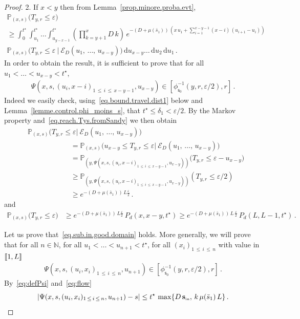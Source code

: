 \documentclass[AHL,Unicode,longabstracts,published]{cedram}
\newcommand{\llbracket}{\mathopen{[\mkern -2.7mu[}}
\newcommand{\rrbracket}{\mathclose{]\mkern -2.7mu]}}
\newcommand{\PP}{\mathbb{P}}
\newcommand{\NN}{\mathbb{N}}
\newcommand{\clE}{\mathcal{E}}
\newcommand{\Sin}{{\mathbf s}_{\textrm{\tiny\rm in}}}
\newcommand{\dif}{\mathrm{d}}
\newcommand{\barmu}{\mu(\bar s_1)}
\newcommand{\ens}[2]{\left[#1,#2\right]}
\newcommand{\phis}{\phi_{\textsf{s}_0}^{-1}}
\newcommand{\setunL}{\llbracket 1, L\rrbracket}
\newcommand{\1}{\mathbf{1}}
\begin{document}
\begin{proof}
2. If $x<y$ then from Lemma~\ref{prop.minore.proba.evt},
\begin{multline}\label{eq.proba.atteinte.depuis.S}
\PP_{(x,s)}
\Big(T_{y,r} \leq \varepsilon\Big)
\\
\geq \int_0^{t^\star} \int_{u_1}^{t^\star}\dots \int_{u_{y-x-1}}^{t^\star}
\left(\prod_{k=y+1}^{x}D\,k\right)\, e^{-(D+\barmu)\,\left(x\,u_1+
\sum\limits_{i=1}^{x-y-1}(x-i)\,(u_{i+1}-u_{i})\right)}\,
\\
\PP_{(x,s)}
\Big(T_{y,r} \leq \varepsilon \ \Big| \ \clE_D(u_1,\,\dots,\,u_{x-y}) \Big)\,
\dif u_{x-y}\dots\,\dif u_2\,\dif u_1\,.
\end{multline}
In order to obtain the result, it is sufficient to prove that for all $u_1<\dots <u_{x-y}<t^\star$,
\begin{align}\label{eq.sub.in.good.domain}
\Psi\left(x,s,(u_i,x-i)_{1\,\leq\,i\,\leq\,x-y-1},u_{x-y}\right)\in \ens{\phis(y,r, \varepsilon/2)}{r}\,.
\end{align}
Indeed we easily check, using~\eqref{eq.bound.travel.dist1} below and Lemma~\ref{lemme.control.phi_moins_s}, that $t^\star\leq \delta_1<\varepsilon/2$. By the Markov property and~\eqref{eq.reach.Tys.fromSandy} we then obtain
\begin{align*}
&\PP_{(x,s)}
\Big(T_{y,r} \leq \varepsilon \Big| \ \clE_D(u_1,\,\dots,\,u_{x-y}) \Big)
\\
&\qquad\qquad\qquad =
\PP_{(x,s)}
\Big(u_{x-y} \leq T_{y,r} \leq \varepsilon \Big| \ \clE_D(u_1,\,\dots,\,u_{x-y}) \Big)
\\
&\qquad\qquad\qquad =
\PP_{\left(y,\Psi\left(x,s,(u_i,x-i)_{1\,\leq\,i\,\leq\,x-y-1},u_{x-y}\right)\right)}
\Big(T_{y,r} \leq \varepsilon-u_{x-y} \Big)
\\
&\qquad\qquad\qquad \geq
\PP_{\left(y,\Psi\left(x,s,(u_i,x-i)_{1\,\leq\,i\,\leq\,x-y-1},u_{x-y}\right)\right)}
\left(T_{y,r} \leq \varepsilon/2 \right)
\\
&\qquad\qquad\qquad \geq e^{-(D+\barmu)\,L\frac{\varepsilon}{2}}\,.
\end{align*}
and
\begin{align*}
\PP_{(x,s)}
\Big(T_{y,r} \leq \varepsilon\Big) &\geq e^{-(D+\barmu)\,L\frac{\varepsilon}{2}}\, P_d(x,x-y, t^\star)
\geq e^{-(D+\barmu)\,L\,\frac{\varepsilon}{2}}\, P_d(L,L-1, t^\star)\,.
\end{align*}

Let us prove that~\eqref{eq.sub.in.good.domain} holds. More generally, we will prove that for all $n\in \NN$, for all $u_1<\dots< u_{n+1}<t^\star$, for all $(x_i)_{1\,\leq\,i\,\leq\,n}$ with value in $\setunL$
\begin{align}\label{eq.sub.in.good.domain.general}
\Psi\left(x,s,(u_i,x_i)_{1\,\leq\,i\,\leq\,n},u_{n+1}\right)\in \ens{\phis(y,r, \varepsilon/2)}{r}\,.
\end{align}
By~\eqref{eq:defPsi} and~\eqref{eq:flow}
\begin{equation}\label{eq.bound.travel.dist}
\left|\Psi(x,s,(u_i,x_i)_{1\,\leq\,i\,\leq\,n},u_{n+1})-s\right| \leq t^\star\,\max\{D\,\Sin,\, k\,\barmu\,L\}\,.
\end{equation}


\end{proof}
\end{document}
